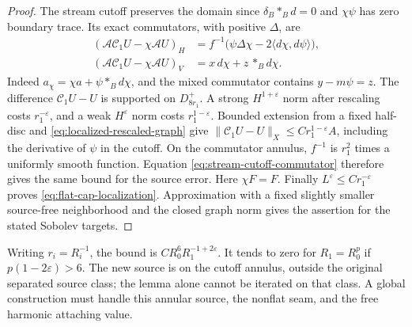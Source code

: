 \documentclass[11pt]{amsart}
\theoremstyle{definition}
\theoremstyle{remark}
\theoremstyle{plain}
\begin{document}
\begin{proof}
The stream cutoff preserves the domain since
$\delta_B*_Bd=0$ and $\chi\psi$ has zero boundary trace.
Its exact commutators, with positive $\Delta$, are
\begin{equation}\label{eq:stream-cutoff-commutator}
 \begin{aligned}
  (\mathcal A\mathcal C_1U-\chi\mathcal AU)_H
   &=f^{-1}\bigl(\psi\Delta\chi
                       -2\langle d\chi,d\psi\rangle\bigr),\\
  (\mathcal A\mathcal C_1U-\chi\mathcal AU)_V
   &=x\,d\chi+z\,*_Bd\chi.
 \end{aligned}
\end{equation}
Indeed $a_\chi=\chi a+\psi*_Bd\chi$, and the mixed
commutator contains $y-m\psi=z$.
The difference $\mathcal C_1U-U$ is supported on $D_{8r_1}^+$.
A strong $H^{1+\varepsilon}$ norm after rescaling costs
$r_1^{-\varepsilon}$, and a weak $H^\varepsilon$ norm
costs $r_1^{1-\varepsilon}$. Bounded extension from a fixed
half-disc and \eqref{eq:localized-rescaled-graph} give
$\|\mathcal C_1U-U\|_X\leq Cr_1^{1-\varepsilon}A$,
including the derivative of $\psi$ in the cutoff.
On the commutator annulus, $f^{-1}$ is $r_1^2$ times a
uniformly smooth function. Equation
\eqref{eq:stream-cutoff-commutator} therefore gives the
same bound for the source error. Here $\chi F=F$.
Finally $L^\varepsilon\leq Cr_1^{-\varepsilon}$ proves
\eqref{eq:flat-cap-localization}. Approximation with a fixed
slightly smaller source-free neighborhood and the closed graph
norm gives the assertion for the stated Sobolev targets.
\end{proof}

Writing $r_i=R_i^{-1}$, the bound is
$CR_0^6R_1^{-1+2\varepsilon}$. It tends to zero for
$R_1=R_0^p$ if $p(1-2\varepsilon)>6$.
The new source is on the cutoff annulus, outside the original
separated source class; the lemma alone cannot be iterated
on that class. A global construction must handle this annular
source, the nonflat seam, and the free harmonic attaching value.
\end{document}
